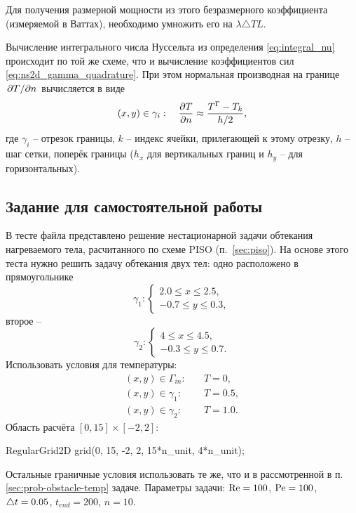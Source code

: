 Для получения размерной мощности из этого безразмерного коэффициента (измеряемой в Ваттах),
необходимо умножить его на $\lambda \triangle T L$.

Вычисление интегрального числа Нуссельта из определения \cref{eq:integral_nu} происходит по той
же схеме, что и вычисление коэффициентов сил \cref{eq:ns2d_gamma_quadrature}.
При этом нормальная производная на границе $\left.\partial T\middle/\partial n\right.$ вычисляется в виде
\begin{equation}
\label{eq:dtdn_scheme}
(x,y)\in\gamma_i: \quad \frac{\partial T}{\partial n} \approx \frac{T^\Gamma - T_k}{h/2},
\end{equation}
где $\gamma_i$ -- отрезок границы, $k$ -- индекс ячейки, прилегающей к этому отрезку,
$h$ -- шаг сетки, поперёк границы ($h_x$ для вертикальных границ и $h_y$ -- для горизонтальных).


\subsection{Задание для самостоятельной работы}
В тесте  файла  представлено решение нестационарной задачи обтекания
нагреваемого тела, расчитанного по схеме PISO (п.~\ref{sec:piso}).
На основе этого теста нужно решить задачу обтекания двух тел: одно расположено
в прямоугольнике
$$
\gamma_1: \begin{cases}
2.0 \leq x \leq 2.5, \\
-0.7 \leq y \leq 0.3,
\end{cases}
$$
второе --
$$
\gamma_2: \begin{cases}
4 \leq x \leq 4.5, \\
-0.3 \leq y \leq 0.7.
\end{cases}
$$
Использовать условия для температуры:
\begin{align*}
(x, y) \in \Gamma_{in}: \quad &T= 0, \\
(x, y) \in \gamma_1: \quad &T=0.5,\\
(x, y) \in \gamma_2: \quad &T=1.0.
\end{align*}
Область расчёта $[0,15]\times[-2,2]$:
\begin{cppcode}
RegularGrid2D grid(0, 15, -2, 2, 15*n_unit, 4*n_unit);
\end{cppcode}
Остальные граничные условия использовать те же, что и
в рассмотренной в п. \ref{sec:prob-obstacle-temp} задаче.
Параметры задачи:
$\mathrm{Re} = 100$, $\mathrm{Pe} = 100$, $\triangle t = 0.05$, $t_{end} = 200$, $n=10$.


